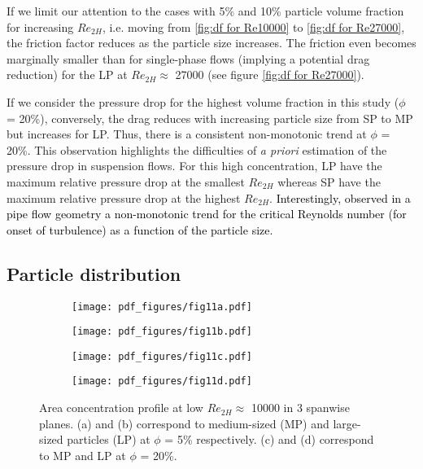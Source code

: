 \documentclass{jfm}
\def\sz#1{{\textcolor{black}{#1}}}
\begin{document}
If we limit our attention to the cases with 5\% and 10\% particle volume fraction for increasing $Re_{2H}$, i.e. moving from \ref{fig:df for Re10000} to \ref{fig:df for Re27000}, the friction factor reduces as the particle size increases. The friction even becomes marginally smaller than for single-phase flows (implying a potential drag reduction) for the LP at $Re_{2H}\approx$ 27000 (see figure \ref{fig:df for Re27000}).  

If we consider the pressure drop for the highest volume fraction in this study ($\phi$ = 20\%), conversely, the drag reduces with increasing particle size from SP to MP but increases for LP. Thus, there is a consistent non-monotonic trend at $\phi$ = 20\%. This observation highlights the difficulties of {\it a priori} estimation of the pressure drop in suspension flows. For this high concentration, LP have the maximum relative pressure drop at the smallest $Re_{2H}$ whereas SP have the maximum relative pressure drop at the highest $Re_{2H}$. \sz{Interestingly, \cite{matas2003transition} observed in a pipe flow geometry a non-monotonic trend for the critical Reynolds number (for onset of turbulence) as a function of the particle size.}

\subsection{Particle distribution}

\begin{figure}
\centering
\begin{subfigure}{.4\textwidth}
  \centering
  \texttt{[image: pdf\_figures/fig11a.pdf]}
  \caption{}
  \label{fig:3mm_5p_Re10000_phi}
\end{subfigure}%
\begin{subfigure}{.4\textwidth}
  \centering
  \texttt{[image: pdf\_figures/fig11b.pdf]}
  \caption{}
  \label{fig:6mm_5p_Re10000_phi}
\end{subfigure}
\begin{subfigure}{.4\textwidth}
  \centering
  \texttt{[image: pdf\_figures/fig11c.pdf]}
  \caption{}
  \label{fig:3mm_20p_Re10000_phi}
\end{subfigure}%
\begin{subfigure}{.4\textwidth}
  \centering
  \texttt{[image: pdf\_figures/fig11d.pdf]}
  \caption{}
  \label{fig:6mm_20p_Re10000_phi}
\end{subfigure}
\caption{Area concentration profile at low $Re_{2H}\approx$ 10000 in 3 spanwise planes. (a) and (b) correspond to medium-sized (MP) and large-sized particles (LP) at $\phi$ = 5\% respectively. (c) and (d) correspond to MP and LP at $\phi$ = 20\%.}
\label{fig:Re10000_phi}
\end{figure}
\end{document}

